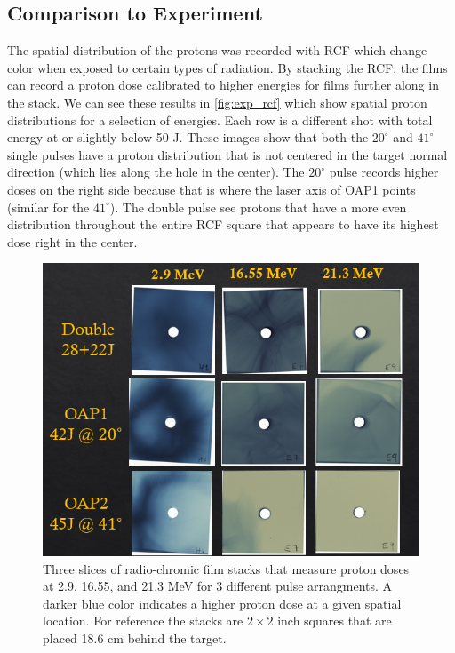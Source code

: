 \subsection{Comparison to Experiment}

The spatial distribution of the protons was recorded with \gls{RCF} which change color when exposed to certain types of radiation. By stacking the \gls{RCF}, the films can record a proton dose calibrated to higher energies for films further along in the stack. We can see these results in \autoref{fig:exp_rcf} which show spatial proton distributions for a selection of energies. Each row is a different shot with total energy at or slightly below 50 J. These images show that both the $20^\circ$ and $41^\circ$ single pulses have a proton distribution that is not centered in the target normal direction (which lies along the hole in the center). The $20^\circ$ pulse records higher doses on the right side because that is where the laser axis of OAP1 points (similar for the $41^\circ$). The double pulse see protons that have a more even distribution throughout the entire \gls{RCF} square that appears to have its highest dose right in the center.

\begin{figure}
	\centering
	\includegraphics[width=0.9\linewidth]{planning/images/titan/rcf.png}
	\caption{Three slices of radio-chromic film stacks that measure proton doses at 2.9, 16.55, and 21.3 MeV for 3 different pulse arrangments. A darker blue color indicates a higher proton dose at a given spatial location. For reference the stacks are $2 \times 2$ inch squares that are placed 18.6 cm behind the target.}
	\label{fig:exp_rcf}
\end{figure}

